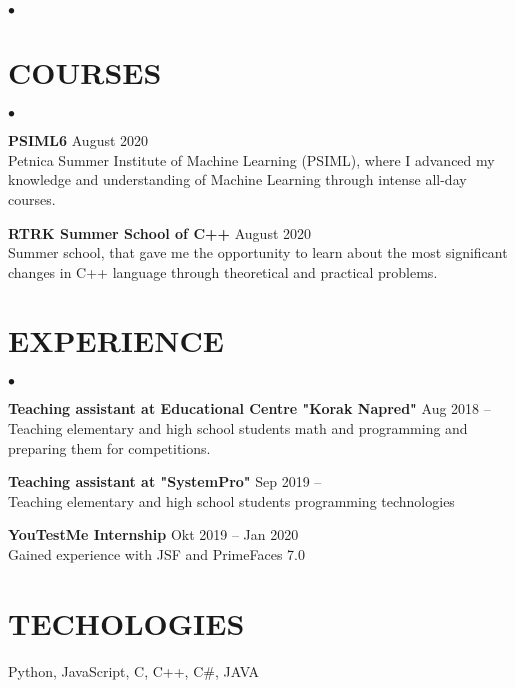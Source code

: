 \documentclass[margin,line]{res}
\newenvironment{list2}{
  \begin{list}{$\bullet$}{%
      \setlength{\itemsep}{0in}
      \setlength{\parsep}{0in} \setlength{\parskip}{0in}
      \setlength{\topsep}{0in} \setlength{\partopsep}{0in}
      \setlength{\leftmargin}{0.2in}}}{\end{list}}
\begin{document}
\begin{resume}
\begin{list2}
\end{list2}

\section{COURSES}
\begin{list2}
  \item {\bf PSIML6} \hfill August 2020\\
    Petnica Summer Institute of Machine Learning (PSIML), where I
    advanced my knowledge and understanding of Machine Learning
    through intense all-day courses.

  \item {\bf RTRK Summer School of C++} \hfill August 2020\\
    Summer school, that gave me the opportunity to learn about the
    most significant changes in C++ language through theoretical and
    practical problems.

\end{list2}


\section{EXPERIENCE} 
\begin{list2}
  \item{\bf Teaching assistant at Educational Centre "Korak Napred"}  \hfill Aug 2018 --\\
    Teaching elementary and high school students math and programming and preparing them for competitions.
  \item{\bf Teaching assistant at "SystemPro"}  \hfill Sep 2019 --\\
    Teaching elementary and high school students programming technologies 
  \item{\bf YouTestMe Internship}  \hfill Okt 2019 -- Jan 2020\\
    Gained experience with JSF and PrimeFaces 7.0
\end{list2}

\section{TECHOLOGIES}  
Python, JavaScript, C, C++, C\#, JAVA

\end{resume}
\end{document}
